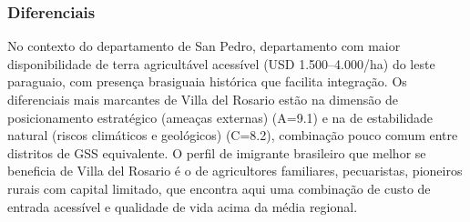 \subsubsection*{Diferenciais}\label{dif-villa-del-rosario-0213}
No contexto do departamento de San Pedro, departamento com maior disponibilidade de terra agricultável acessível (USD 1.500–4.000/ha) do leste paraguaio, com presença brasiguaia histórica que facilita integração. Os diferenciais mais marcantes de Villa del Rosario estão na dimensão de posicionamento estratégico (ameaças externas) (A=9.1) e na de estabilidade natural (riscos climáticos e geológicos) (C=8.2), combinação pouco comum entre distritos de GSS equivalente. O perfil de imigrante brasileiro que melhor se beneficia de Villa del Rosario é o de agricultores familiares, pecuaristas, pioneiros rurais com capital limitado, que encontra aqui uma combinação de custo de entrada acessível e qualidade de vida acima da média regional.
